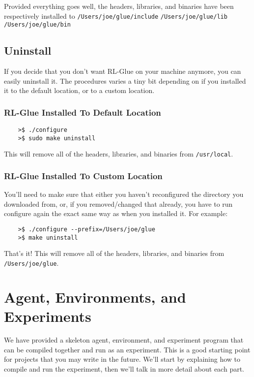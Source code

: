 \documentclass[11pt]{article}
\begin{document}
Provided everything goes well, the headers, libraries, and binaries have been respectively installed to\newline
\texttt{/Users/joe/glue/include}\newline
\texttt{/Users/joe/glue/lib}\newline
\texttt{/Users/joe/glue/bin}


\subsection{Uninstall}
If you decide that you don't want  RL-Glue on your machine anymore, you can easily uninstall it.  The procedures varies a tiny bit depending on if you installed it to the default location, or to a custom location.

\subsubsection{RL-Glue Installed To Default Location}
\begin{verbatim}
	>$ ./configure
	>$ sudo make uninstall
\end{verbatim}

This will remove all of the headers, libraries, and binaries from \texttt{/usr/local}.

\subsubsection{RL-Glue Installed To Custom Location}
You'll need to make sure that either you haven't reconfigured the directory you downloaded from, or, if you removed/changed that already, you have to run configure again the exact same way as when you installed it.  For example:
\begin{verbatim}
	>$ ./configure --prefix=/Users/joe/glue
	>$ make uninstall
\end{verbatim}

That's it!  This will remove all of the headers, libraries, and binaries from \texttt{/Users/joe/glue}.

\section{Agent, Environments, and Experiments}
We have provided a skeleton agent, environment, and experiment program that can be compiled together and run as an experiment.
This is a good starting point for projects that you may write in the future.  We'll start by explaining how to compile and
run the experiment, then we'll talk in more detail about each part.
\end{document}

